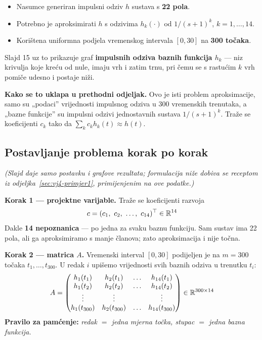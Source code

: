 \begin{itemize}
  \item Nasumce generiran impulsni odziv $h$ sustava s \textbf{22 pola}.
  \item Potrebno je aproksimirati $h$ s odzivima $h_k(\cdot)$ od
        $1/(s+1)^k$, $k = 1,\dots,14$.
  \item Korištena uniformna podjela vremenskog intervala $[0,30]$ na
        \textbf{300 točaka}.
\end{itemize}

Slajd 15 uz to prikazuje graf \textbf{impulsnih odziva baznih funkcija $h_k$}
--- niz krivulja koje kreću od nule, imaju vrh i zatim trnu, pri čemu se s
rastućim $k$ vrh pomiče udesno i postaje niži.

\textbf{Kako se to uklapa u prethodni odjeljak.} Ovo je isti problem
aproksimacije, samo su „podaci” vrijednosti impulsnog odziva u 300 vremenskih
trenutaka, a „bazne funkcije” su impulsni odzivi jednostavnih sustava
$1/(s+1)^k$. Traže se koeficijenti $c_k$ tako da
$\sum_k c_k h_k(t) \approx h(t)$.

\subsection*{Postavljanje problema korak po korak}

\emph{(Slajd daje samo postavku i grafove rezultata; formulacija niže dobiva se
receptom iz odjeljka~\ref{sec:vj4-primjer1}, primijenjenim na ove podatke.)}

\textbf{Korak 1 --- projektne varijable.} Traže se koeficijenti razvoja
\[
c = (c_1,\ c_2,\ \dots,\ c_{14})^{\top} \in \mathbb{R}^{14}
\]
Dakle \textbf{14 nepoznanica} --- po jedna za svaku baznu funkciju. Sam sustav
ima 22 pola, ali ga aproksimiramo s manje članova; zato aproksimacija i nije
točna.

\textbf{Korak 2 --- matrica $A$.} Vremenski interval $[0,30]$ podijeljen je na
$m = 300$ točaka $t_1,\dots,t_{300}$. U redak $i$ upišemo vrijednosti svih
baznih odziva u trenutku $t_i$:
\[
A = \begin{pmatrix}
h_1(t_1) & h_2(t_1) & \dots & h_{14}(t_1) \\
h_1(t_2) & h_2(t_2) & \dots & h_{14}(t_2) \\
\vdots & \vdots & & \vdots \\
h_1(t_{300}) & h_2(t_{300}) & \dots & h_{14}(t_{300})
\end{pmatrix} \in \mathbb{R}^{300\times14}
\]
\textbf{Pravilo za pamćenje:} \emph{redak $=$ jedna mjerna točka, stupac $=$
jedna bazna funkcija.}

